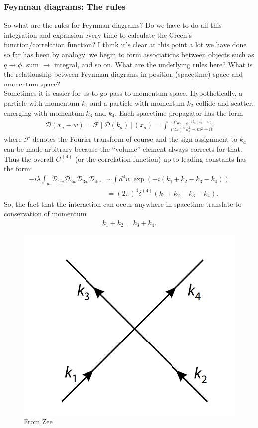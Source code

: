 \documentclass{book}
\theoremstyle{definition}
\newcommand{\F}{\mathcal{F}}
\newcommand{\f}[2]{\frac{#1}{#2}}
\newcommand{\lp}{\left(}
\newcommand{\rp}{\right)}
\newcommand{\D}{\mathcal{D}}
\begin{document}
\subsubsection{Feynman diagrams: The rules}

So what are the rules for Feynman diagrams? Do we have to do all this integration and expansion every time to calculate the Green's function/correlation function? I think it's clear at this point a lot we have done so far has been by analogy: we begin to form associations between objects such as $q \to \phi$, sum $\to$ integral, and so on. What are the underlying rules here? What is the relationship between Feynman diagrams in position (spacetime) space and momentum space? \\

Sometimes it is easier for us to go pass to momentum space. Hypothetically, a particle with momentum $k_1$ and a particle with momentum $k_2$ collide and scatter, emerging with momentum $k_3$ and $k_4$. Each spacetime propagator has the form
\begin{align}
\D(x_a - w) = \F[\D(k_a)](x_a) = \int \f{d^4k_a}{(2\pi)^4} \f{e^{\pm ik_a(x_a - w)}}{k_a^2 - m^2 + i\epsilon}
\end{align}
where $\F$ denotes the Fourier transform of course and the sign assignment to $k_a$ can be made arbitrary because the ``volume'' element always corrects for that. Thus the overall $G^{(4)}$ (or the correlation function) up to leading constants has the form:
\begin{align}
-i\lambda \int_w \D_{1w}\D_{2w}\D_{3w}\D_{4w} &\sim \int d^4w \, \exp\lp -i(k_1 + k_2 - k_3 - k_4) \rp \\
&= (2\pi)^4\delta^{(4)}(k_1 + k_2 - k_3 - k_4).
\end{align}
So, the fact that the interaction can occur anywhere in spacetime translate to conservation of momentum:
\begin{align}
k_1 + k_2 = k_3 + k_4.
\end{align}
\begin{figure}[!htb]
	\centering
	\includegraphics[scale=0.3]{momentum-propagator}
	\caption{From Zee}
\end{figure}
\end{document}
